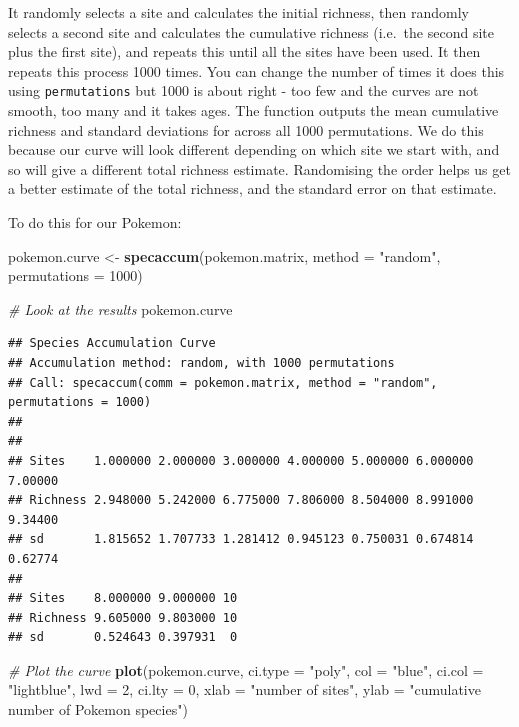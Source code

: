 \documentclass[]{book}
\newenvironment{Shaded}{\begin{snugshade}}{\end{snugshade}}
\newcommand{\KeywordTok}[1]{\textcolor[rgb]{0.13,0.29,0.53}{\textbf{{#1}}}}
\newcommand{\DataTypeTok}[1]{\textcolor[rgb]{0.13,0.29,0.53}{{#1}}}
\newcommand{\DecValTok}[1]{\textcolor[rgb]{0.00,0.00,0.81}{{#1}}}
\newcommand{\StringTok}[1]{\textcolor[rgb]{0.31,0.60,0.02}{{#1}}}
\newcommand{\CommentTok}[1]{\textcolor[rgb]{0.56,0.35,0.01}{\textit{{#1}}}}
\newcommand{\NormalTok}[1]{{#1}}
\begin{document}
It randomly selects a site and calculates the initial richness, then
randomly selects a second site and calculates the cumulative richness
(i.e.~the second site plus the first site), and repeats this until all
the sites have been used. It then repeats this process 1000 times. You
can change the number of times it does this using \texttt{permutations}
but 1000 is about right - too few and the curves are not smooth, too
many and it takes ages. The function outputs the mean cumulative
richness and standard deviations for across all 1000 permutations. We do
this because our curve will look different depending on which site we
start with, and so will give a different total richness estimate.
Randomising the order helps us get a better estimate of the total
richness, and the standard error on that estimate.

To do this for our Pokemon:

\begin{Shaded}
\begin{Highlighting}[]
\NormalTok{pokemon.curve <-}\StringTok{ }\KeywordTok{specaccum}\NormalTok{(pokemon.matrix, }\DataTypeTok{method =} \StringTok{"random"}\NormalTok{, }\DataTypeTok{permutations =} \DecValTok{1000}\NormalTok{)}

\CommentTok{# Look at the results}
\NormalTok{pokemon.curve}
\end{Highlighting}
\end{Shaded}

\begin{verbatim}
## Species Accumulation Curve
## Accumulation method: random, with 1000 permutations
## Call: specaccum(comm = pokemon.matrix, method = "random", permutations = 1000) 
## 
##                                                                       
## Sites    1.000000 2.000000 3.000000 4.000000 5.000000 6.000000 7.00000
## Richness 2.948000 5.242000 6.775000 7.806000 8.504000 8.991000 9.34400
## sd       1.815652 1.707733 1.281412 0.945123 0.750031 0.674814 0.62774
##                              
## Sites    8.000000 9.000000 10
## Richness 9.605000 9.803000 10
## sd       0.524643 0.397931  0
\end{verbatim}

\begin{Shaded}
\begin{Highlighting}[]
\CommentTok{# Plot the curve}
\KeywordTok{plot}\NormalTok{(pokemon.curve, }\DataTypeTok{ci.type =} \StringTok{"poly"}\NormalTok{, }\DataTypeTok{col =} \StringTok{"blue"}\NormalTok{, }\DataTypeTok{ci.col =} \StringTok{"lightblue"}\NormalTok{, }
     \DataTypeTok{lwd =} \DecValTok{2}\NormalTok{, }\DataTypeTok{ci.lty =} \DecValTok{0}\NormalTok{, }\DataTypeTok{xlab =} \StringTok{"number of sites"}\NormalTok{, }
     \DataTypeTok{ylab =} \StringTok{"cumulative number of Pokemon species"}\NormalTok{)}
\end{Highlighting}
\end{Shaded}
\end{document}
